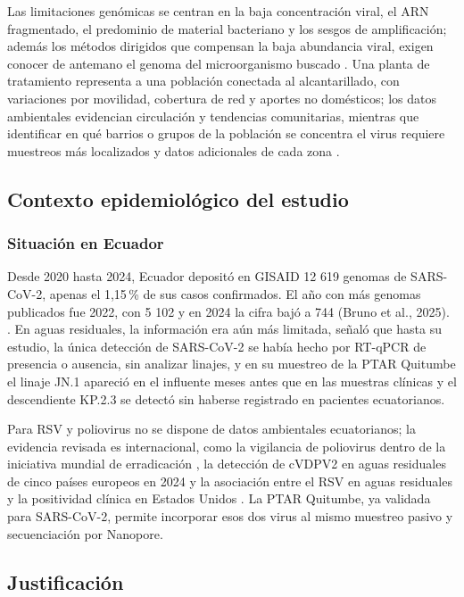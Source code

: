 Las limitaciones genómicas se centran en la baja concentración viral, el ARN fragmentado, el predominio de material bacteriano y los sesgos de amplificación; además los métodos dirigidos que compensan la baja abundancia viral, exigen conocer de antemano el genoma del microorganismo buscado \cite{Child_2023}. Una planta de tratamiento representa a una población conectada al alcantarillado, con variaciones por movilidad, cobertura de red y aportes no domésticos; los datos ambientales evidencian circulación y tendencias comunitarias, mientras que identificar en qué barrios o grupos de la población se concentra el virus requiere muestreos más localizados y datos adicionales de cada zona \cite{Parkins_2023,Sims_2020}.

\subsection{Contexto epidemiológico del estudio}

\subsubsection{Situación en Ecuador}

Desde 2020 hasta 2024, Ecuador depositó en GISAID 12 619 genomas de SARS-CoV-2, apenas el 1,15\,\% de sus casos confirmados. El año con más genomas publicados fue 2022, con 5 102 y en 2024 la cifra bajó a 744 (Bruno et al., 2025). \cite{Bruno_2025}. En aguas residuales, la información era aún más limitada,  señaló que hasta su estudio, la única detección de SARS-CoV-2 se había hecho por RT-qPCR de presencia o ausencia, sin analizar linajes, y en su muestreo de la PTAR Quitumbe el linaje JN.1 apareció en el influente meses antes que en las muestras clínicas y el descendiente KP.2.3 se detectó sin haberse registrado en pacientes ecuatorianos.

Para RSV y poliovirus no se dispone de datos ambientales ecuatorianos; la evidencia revisada es internacional, como la vigilancia de poliovirus dentro de la iniciativa mundial de erradicación \cite{Asghar_2014}, la detección de cVDPV2 en aguas residuales de cinco países europeos en 2024 \cite{Bottcher_2025} y la asociación entre el RSV en aguas residuales y la positividad clínica en Estados Unidos \cite{Hughes_2022}. La PTAR Quitumbe, ya validada para SARS-CoV-2, permite incorporar esos dos virus al mismo muestreo pasivo y secuenciación por Nanopore.

\subsection{Justificación}

